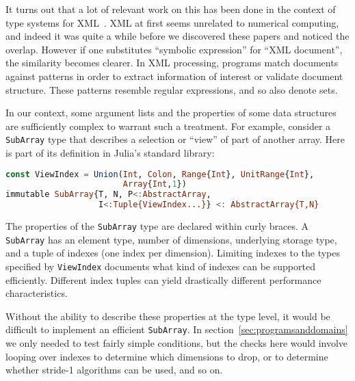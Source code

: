 
It turns out that a lot of relevant work on this has been done in the
context of type systems for XML~\cite{hosoya2000xduce, BCF03}.
XML at first seems unrelated to numerical computing, and indeed it
was quite a while before we discovered these papers and noticed the
overlap.
However if one substitutes ``symbolic expression'' for ``XML document'',
the similarity becomes clearer.
In XML processing, programs match documents against patterns in order
to extract information of interest or validate document structure.
These patterns resemble regular expressions, and so also denote sets.

In our context, some argument lists and the properties of some data
structures are sufficiently complex to warrant such a treatment.
For example, consider a \texttt{SubArray} type that describes a
selection or ``view'' of part of another array.
Here is part of its definition in Julia's standard library:

\begin{singlespace}
\begin{lstlisting}[language=julia]
const ViewIndex = Union(Int, Colon, Range{Int}, UnitRange{Int},
                        Array{Int,1})
immutable SubArray{T, N, P<:AbstractArray,
                   I<:Tuple{ViewIndex...}} <: AbstractArray{T,N}
\end{lstlisting}
\end{singlespace}

\noindent
The properties of the \texttt{SubArray} type are declared within curly
braces.
A \texttt{SubArray} has an element type, number of dimensions,
underlying storage type, and a tuple of indexes (one index per dimension).
Limiting indexes to the types specified by \texttt{ViewIndex}
documents what kind of indexes can be supported efficiently.
Different index tuples can yield drastically different performance
characteristics.

Without the ability to describe these properties at the type level,
it would be difficult to implement an efficient \texttt{SubArray}.
In section~\ref{sec:programsanddomains} we only needed to test fairly
simple conditions, but the checks here would involve looping over
indexes to determine which dimensions to drop, or to determine whether
stride-1 algorithms can be used, and so on.

